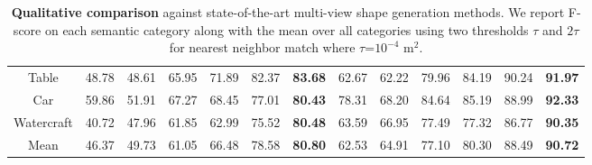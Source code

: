 \begin{table*}[ht]
\begin{center}
{\begin{tabular}{|c|cccccc|cccccc|}
    Table       & 48.78 & 48.61 & 65.95 & 71.89 & 82.37 & \bf{83.68}    & 62.67 & 62.22 & 79.96 & 84.19 & 90.24 & \bf{91.97} \\
    Car         & 59.86 & 51.91 & 67.27 & 68.45 & 77.01 & \bf{80.43}    & 78.31 & 68.20 & 84.64 & 85.19 & 88.99 & \bf{92.33} \\
    Watercraft  & 40.72 & 47.96 & 61.85 & 62.99 & 75.52 & \bf{80.48}    & 63.59 & 66.95 & 77.49 & 77.32 & 86.77 & \bf{90.35} \\
    \hline
    Mean        & 46.37 & 49.73 & 61.05 & 66.48 & 78.58 & \bf{80.80}    & 62.53 & 64.91 & 77.10 & 80.30 & 88.49 & \bf{90.72} \\
    \hline
\end{tabular}}
\end{center}
\vspace{-4mm}
\caption{
    \textbf{Qualitative comparison} against state-of-the-art multi-view shape generation methods. We report F-score on each semantic category along with the mean over all categories using two thresholds $\tau$ and $2\tau$ for nearest neighbor match where ${\tau}$=$10^{-4}$ m$^2$.
}
\label{table:baseline_comparison}
\end{table*}


